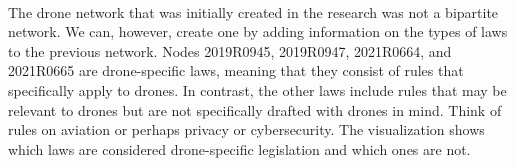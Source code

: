     \begin{center}
    \end{center}
    { \hspace*{\fill} \\}
    
    The drone network that was initially created in the research was not a
bipartite network. We can, however, create one by adding information on
the types of laws to the previous network. Nodes 2019R0945, 2019R0947,
2021R0664, and 2021R0665 are drone-specific laws, meaning that they
consist of rules that specifically apply to drones. In contrast, the
other laws include rules that may be relevant to drones but are not
specifically drafted with drones in mind. Think of rules on aviation or
perhaps privacy or cybersecurity. The visualization shows which laws are
considered drone-specific legislation and which ones are not.

